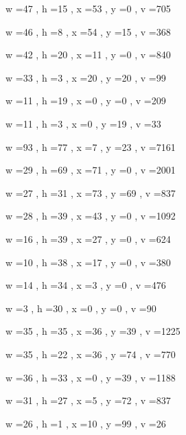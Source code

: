 \documentclass[11pt]{article}
\begin{document}
w =47 , h =15 , x =53 , y =0 , v =705
\par
w =46 , h =8 , x =54 , y =15 , v =368
\par
w =42 , h =20 , x =11 , y =0 , v =840
\par
w =33 , h =3 , x =20 , y =20 , v =99
\par
w =11 , h =19 , x =0 , y =0 , v =209
\par
w =11 , h =3 , x =0 , y =19 , v =33
\par
w =93 , h =77 , x =7 , y =23 , v =7161
\par
\newpage




w =29 , h =69 , x =71 , y =0 , v =2001
\par
w =27 , h =31 , x =73 , y =69 , v =837
\par
w =28 , h =39 , x =43 , y =0 , v =1092
\par
w =16 , h =39 , x =27 , y =0 , v =624
\par
w =10 , h =38 , x =17 , y =0 , v =380
\par
w =14 , h =34 , x =3 , y =0 , v =476
\par
w =3 , h =30 , x =0 , y =0 , v =90
\par
w =35 , h =35 , x =36 , y =39 , v =1225
\par
w =35 , h =22 , x =36 , y =74 , v =770
\par
w =36 , h =33 , x =0 , y =39 , v =1188
\par
w =31 , h =27 , x =5 , y =72 , v =837
\par
w =26 , h =1 , x =10 , y =99 , v =26
\par
\newpage
\end{document}
